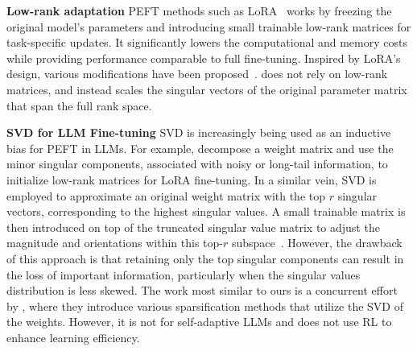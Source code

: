 \textbf{Low-rank adaptation}
PEFT methods such as LoRA~\citep{hu2021lora} works by freezing the original model's parameters and introducing small trainable low-rank matrices for task-specific updates.
It significantly lowers the computational and memory costs while providing performance comparable to full fine-tuning.
Inspired by LoRA's design, various modifications have been proposed~\citep{zhang2023adalora,kopiczko2023vera,liu2024dora,balazy2024lora,huggingface2023svdtraining}.
\implname does not rely on low-rank matrices, and instead scales the singular vectors of the original parameter matrix that span the full rank space.


\textbf{SVD for LLM Fine-tuning}
SVD is increasingly being used as an inductive bias for PEFT in LLMs.
For example, \citet{wang2024milora} decompose a weight matrix and use the minor singular components, associated with noisy or long-tail information, to initialize low-rank matrices for LoRA fine-tuning.
In a similar vein, SVD is employed to approximate an original weight matrix with the top $r$ singular vectors, corresponding to the highest singular values.
A small trainable matrix is then introduced on top of the truncated singular value matrix to adjust the magnitude and orientations within this top-$r$ subspace~\citep{balazy2024lora,huggingface2023svdtraining}.
However, the drawback of this approach is that retaining only the top singular components can result in the loss of important information, particularly when the singular values distribution is less skewed.
The work most similar to ours is a concurrent effort by \citet{lingam2024svft}, where they introduce various sparsification methods that utilize the SVD of the weights.
However, it is not for self-adaptive LLMs and does not use RL to enhance learning efficiency.